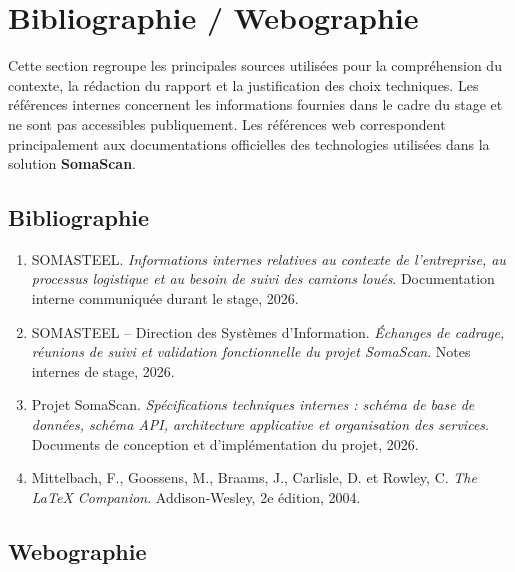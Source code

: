 \chapter*{Bibliographie / Webographie}
{}

Cette section regroupe les principales sources utilisées pour la compréhension du contexte, la rédaction du rapport et la justification des choix techniques. Les références internes concernent les informations fournies dans le cadre du stage et ne sont pas accessibles publiquement. Les références web correspondent principalement aux documentations officielles des technologies utilisées dans la solution \textbf{SomaScan}.

\section*{Bibliographie}
{}

\begin{enumerate}
    \item SOMASTEEL. \textit{Informations internes relatives au contexte de l'entreprise, au processus logistique et au besoin de suivi des camions loués}. Documentation interne communiquée durant le stage, 2026.

    \item SOMASTEEL -- Direction des Systèmes d'Information. \textit{Échanges de cadrage, réunions de suivi et validation fonctionnelle du projet SomaScan}. Notes internes de stage, 2026.

    \item Projet SomaScan. \textit{Spécifications techniques internes : schéma de base de données, schéma API, architecture applicative et organisation des services}. Documents de conception et d'implémentation du projet, 2026.

    \item Mittelbach, F., Goossens, M., Braams, J., Carlisle, D. et Rowley, C. \textit{The LaTeX Companion}. Addison-Wesley, 2e édition, 2004.
\end{enumerate}

\section*{Webographie}
{}

